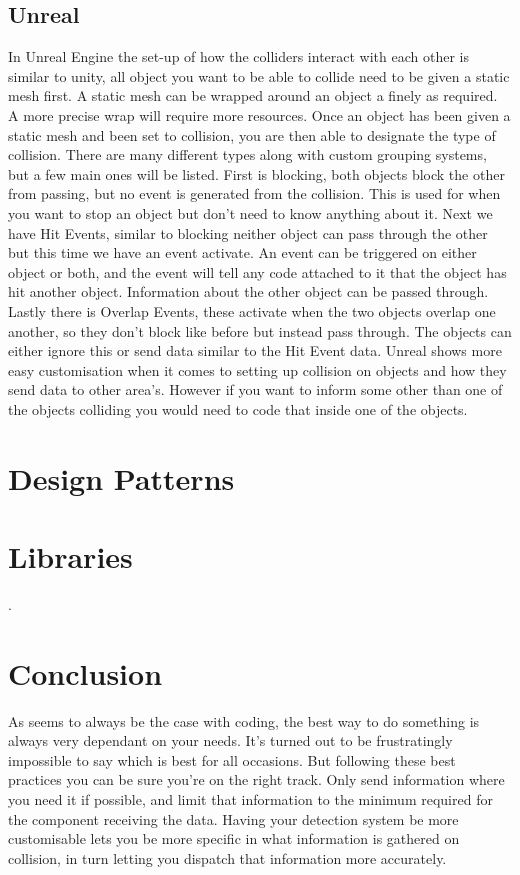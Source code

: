 \documentclass{scrartcl}
\begin{document}
	\subsection{Unreal}
	In Unreal Engine the set-up of how the colliders interact with each other is similar to unity, all object you want to be able to collide need to be given a static mesh first. A static mesh can be wrapped around an object a finely as required. A more precise wrap will require more resources. Once an object has been given a static mesh and been set to collision, you are then able to designate the type of collision. There are many different types along with custom grouping systems, but a few main ones will be listed. First is blocking, both objects block the other from passing, but no event is generated from the collision. This is used for when you want to stop an object but don't need to know anything about it. Next we have Hit Events, similar to blocking neither object can pass through the other but this time we have an event activate. An event can be triggered on either object or both, and the event will tell any code attached to it that the object has hit another object. Information about the other object can be passed through. Lastly there is Overlap Events, these activate when the two objects overlap one another, so they don't block like before but instead pass through. The objects can either ignore this or send data similar to the Hit Event data\cite{UnrealCollision}. Unreal shows more easy customisation when it comes to setting up collision on objects and how they send data to other area's. However if you want to inform some other than one of the objects colliding you would need to code that inside one of the objects.
	
	\section{Design Patterns}

	
	\section{Libraries}
.
	
	
	\section{Conclusion}
	As seems to always be the case with coding, the best way to do something is always very dependant on your needs. It's turned out to be frustratingly impossible to say which is best for all occasions. But following these best practices you can be sure you're on the right track. Only send information where you need it if possible, and limit that information to the minimum required for the component receiving the data. Having your detection system be more customisable lets you be more specific in what information is gathered on collision, in turn letting you dispatch that information more accurately.

	
	
	
	
	
\end{document}
